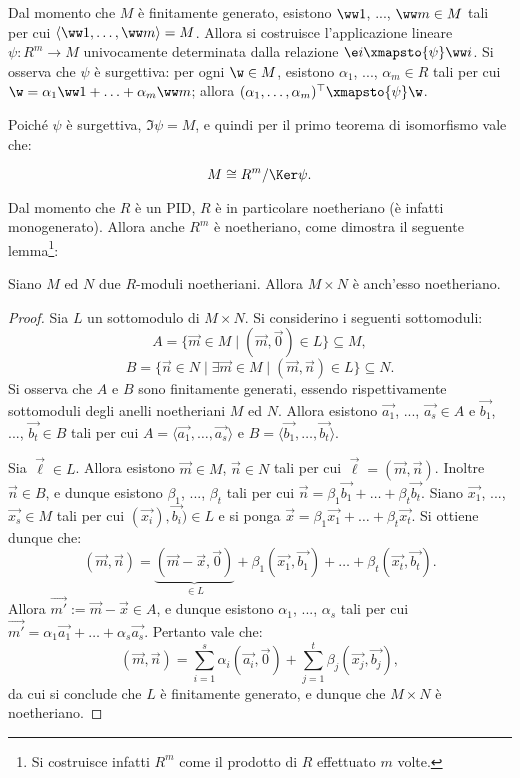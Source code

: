 \documentclass[12pt]{scrartcl}
\begin{document}
	Dal momento che $M$ è finitamente generato, esistono $\ww 1$, ...,
	$\ww m \in M$ tali per cui $\langle \ww 1, \ldots, \ww m  \rangle = M$.
	Allora si costruisce l'applicazione lineare $\psi : R^m \to M$ univocamente
	determinata dalla relazione $\e i \xmapsto{\psi} \ww i$. Si osserva che
	$\psi$ è surgettiva: per ogni $\w \in M$, esistono $\alpha_1$, ..., $\alpha_m \in R$
	tali per cui $\w = \alpha_1 \ww 1 + \ldots + \alpha_m \ww m$; allora
	$(\alpha_1, \ldots, \alpha_m)^\top \xmapsto{\psi} \w$. \medskip

	Poiché $\psi$ è surgettiva, $\Im \psi = M$, e quindi per il primo teorema
	di isomorfismo vale che:

	\begin{equation}
		\label{eq:primo_isomorfismo}
		M \cong R^m/ \Ker \psi.
	\end{equation} \vskip 0.1in

	Dal momento che $R$ è un PID, $R$ è in particolare noetheriano (è infatti
	monogenerato). Allora anche $R^m$ è noetheriano, come dimostra il seguente lemma\footnote{
		Si costruisce infatti $R^m$ come il prodotto di $R$ effettuato $m$ volte.
	}:
	
	\begin{lemma}
		Siano $M$ ed $N$ due $R$-moduli noetheriani. Allora $M \times N$ è
		anch'esso noetheriano.
	\end{lemma}
	
	\begin{proof}
		Sia $L$ un sottomodulo di $M \times N$. Si considerino i seguenti
		sottomoduli:
		\[ A = \{ \vec m \in M \mid (\vec m, \vec 0) \in L \} \subseteq M,\]
		\[ B = \{ \vec n \in N \mid \exists \vec m \in M \mid (\vec m, \vec n) \in L \} \subseteq N.\]
		Si osserva che $A$ e $B$ sono finitamente generati, essendo rispettivamente
		sottomoduli degli anelli noetheriani $M$ ed $N$. Allora esistono
		$\vec{a_1}$, ..., $\vec{a_s} \in A$ e $\vec{b_1}$, ..., $\vec{b_t} \in B$ tali per cui
		$A = \langle \vec{a_1}, \ldots, \vec{a_s} \rangle$ e $B = \langle \vec{b_1}, \ldots, \vec{b_t} \rangle$. 
		\bigskip
		
		
		Sia $\vec \ell \in L$. Allora esistono $\vec m \in M$, $\vec n \in N$ tali per cui
		$\vec \ell = (\vec m, \vec n)$. Inoltre $\vec n \in B$, e dunque esistono $\beta_1$, ..., $\beta_t$
		tali per cui $\vec n = \beta_1 \vec{b_1} + \ldots + \beta_t \vec{b_t}$.
		Siano $\vec{x_1}$, ..., $\vec{x_s} \in M$ tali per cui
		$(\vec{x_i}), \vec{b_i}) \in L$ e si ponga
		$\vec x = \beta_1 \vec{x_1} + \ldots + \beta_t \vec{x_t}$.
		Si ottiene dunque che:
		\[
			(\vec m, \vec n) = \underbrace{(\vec m - \vec x, \vec 0)}_{\in L} + \beta_1 (\vec{x_1}, \vec{b_1}) + \ldots + \beta_t (\vec{x_t}, \vec{b_t}).
		\]
		Allora $\vec{m'} := \vec m - \vec x \in A$, e dunque esistono $\alpha_1$, ..., $\alpha_s$
		tali per cui $\vec{m'} = \alpha_1 \vec{a_1} + \ldots + \alpha_s \vec{a_s}$.
		Pertanto vale che:
		\[
			(\vec m, \vec n) = \sum_{i=1}^s \alpha_i (\vec{a_i}, \vec 0) + \sum_{j=1}^t \beta_j (\vec{x_j}, \vec{b_j}),
		\]
		da cui si conclude che $L$ è finitamente generato, e dunque che $M \times N$
		è noetheriano.
	\end{proof}
	
\end{document}
